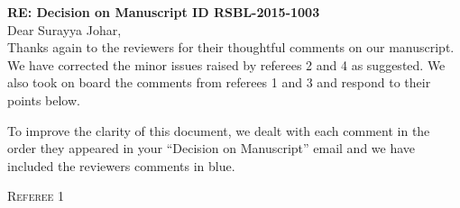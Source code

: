 \documentclass[12pt,letterpaper]{article}
\renewcommand{\section}[1]{%
\bigskip
\begin{center}
\begin{Large}
\normalfont\scshape #1
\medskip
\end{Large}
\end{center}}
\begin{document}
\textbf{RE: Decision on Manuscript ID RSBL-2015-1003}\\
\bigskip
Dear Surayya Johar,\\
\bigskip
Thanks again to the reviewers for their thoughtful comments on our manuscript.
We have corrected the minor issues raised by referees 2 and 4 as suggested.
We also took on board the comments from referees 1 and 3 and respond to their points below.

To improve the clarity of this document, we dealt with each comment in the order they appeared in your ``Decision on Manuscript'' email and we have included the reviewers comments in blue.


\section{Referee 1}
\end{document}
